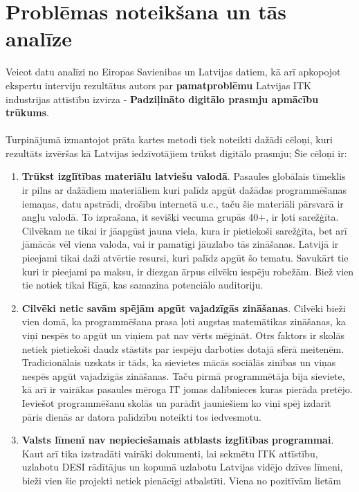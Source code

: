 \section{Problēmas noteikšana un tās analīze}
Veicot datu analīzi no Eiropas Savienibas un Latvijas datiem, kā arī apkopojot ekspertu interviju rezultātus
autors par \textbf{pamatproblēmu} Latvijas ITK industrijas attīstību izvirza - 
\textbf{Padziļināto digitālo prasmju apmācību trūkums}. 
\paragraph{}
Turpinājumā izmantojot prāta kartes metodi tiek noteikti dažādi cēloņi, kuri rezultāts izvēršas kā Latvijas
iedzīvotājiem trūkst digitālo prasmju; Šie cēloņi ir:
\begin{enumerate}
    \item \textbf{Trūkst izglītības materiālu latviešu valodā}.
Pasaules globālais tīmeklis ir pilns ar dažādiem materiāliem kuri palīdz apgūt dažādas programmēšanas iemaņas,
datu apstrādi, drošību internetā u.c., taču šie materiāli pārsvarā ir angļu valodā. To izprašana, it sevišķi 
vecuma grupās 40+, ir ļoti sarežģīta. Cilvēkam ne tikai ir jāapgūst jauna viela, kura ir pietiekoši sarežģīta,
bet arī jāmācās vēl viena valoda, vai ir pamatīgi jāuzlabo tās zināšanas. Latvijā ir pieejami tikai daži 
atvērtie resursi, kuri palīdz apgūt šo tematu. Savukārt tie kuri ir pieejami pa maksu, ir diezgan ārpus cilvēku
iespēju robežām. Biež vien tie notiek tikai Rīgā, kas samazina potenciālo auditoriju.
    \item \textbf{Cilvēki netic savām spējām apgūt vajadzīgās zināšanas}.
Cilvēki bieži vien domā, ka programmēšana prasa ļoti augstas matemātikas zināšanas, ka viņi nespēs to apgūt un
viņiem pat nav vērts mēģināt. Otrs faktors ir skolās netiek pietiekoši daudz stāstīts par iespēju darboties
dotajā sfērā meitenēm. Tradicionālais uzskats ir tāds, ka sievietes mācās sociālās zinības un viņas nespēs
apgūt vajadzīgās zināšanas. Taču pirmā programmētāja bija sieviete, kā arī ir vairākas pasaules mēroga IT jomas
dalībnieces kuras pierāda pretējo. Ieviešot programmēšanu skolās un parādīt jauniešiem ko viņi spēj izdarīt
pāris dienās ar datora palīdzību noteikti tos iedvesmotu.
    \item \textbf{Valsts līmenī nav nepieciešamais atblasts izglītības programmai}.
Kaut arī tika izstradāti vairāki dokumenti, lai sekmētu ITK attīstību, uzlabotu DESI rādītājus un kopumā uzlabotu
Latvijas vidējo dzīves līmeni, bieži vien šie projekti netiek pienācīgi atbalstīti. Viena no pozitīvām lietām

\end{enumerate}

